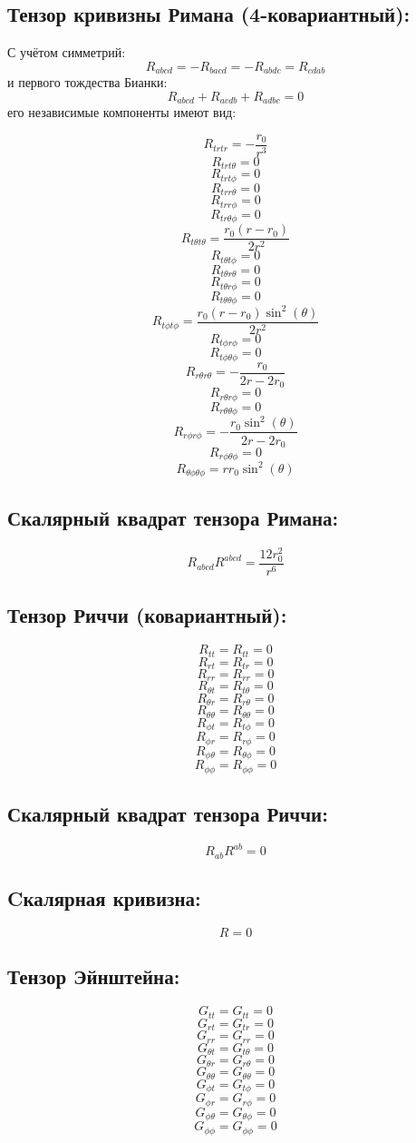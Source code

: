 \documentclass[a4paper, 10pt]{article}
\begin{document}
\subsection{Тензор кривизны Римана (4-ковариантный):}

С учётом симметрий:
$$R_{abcd}=-R_{bacd}=-R_{abdc}=R_{cdab}$$
и первого тождества Бианки:
$$R_{abcd}+R_{acdb}+R_{adbc}=0$$
его независимые компоненты имеют вид:

$$R_{t r t r} = - \frac{r_{0}}{r^{3}}$$
$$R_{t r t \theta} = 0$$
$$R_{t r t \phi} = 0$$
$$R_{t r r \theta} = 0$$
$$R_{t r r \phi} = 0$$
$$R_{t r \theta \phi} = 0$$
$$R_{t \theta t \theta} = \frac{r_{0} \left(r - r_{0}\right)}{2 r^{2}}$$
$$R_{t \theta t \phi} = 0$$
$$R_{t \theta r \theta} = 0$$
$$R_{t \theta r \phi} = 0$$
$$R_{t \theta \theta \phi} = 0$$
$$R_{t \phi t \phi} = \frac{r_{0} \left(r - r_{0}\right) \sin^{2}{\left(\theta \right)}}{2 r^{2}}$$
$$R_{t \phi r \phi} = 0$$
$$R_{t \phi \theta \phi} = 0$$
$$R_{r \theta r \theta} = - \frac{r_{0}}{2 r - 2 r_{0}}$$
$$R_{r \theta r \phi} = 0$$
$$R_{r \theta \theta \phi} = 0$$
$$R_{r \phi r \phi} = - \frac{r_{0} \sin^{2}{\left(\theta \right)}}{2 r - 2 r_{0}}$$
$$R_{r \phi \theta \phi} = 0$$
$$R_{\theta \phi \theta \phi} = r r_{0} \sin^{2}{\left(\theta \right)}$$
\subsection{Скалярный квадрат тензора Римана:}
$$ R_{abcd}R^{abcd} = \frac{12 r_{0}^{2}}{r^{6}}$$
\subsection{Тензор Риччи (ковариантный):}
$$R_{t t} = R_{t t} = 0$$
$$R_{r t} = R_{t r} = 0$$
$$R_{r r} = R_{r r} = 0$$
$$R_{\theta t} = R_{t \theta} = 0$$
$$R_{\theta r} = R_{r \theta} = 0$$
$$R_{\theta \theta} = R_{\theta \theta} = 0$$
$$R_{\phi t} = R_{t \phi} = 0$$
$$R_{\phi r} = R_{r \phi} = 0$$
$$R_{\phi \theta} = R_{\theta \phi} = 0$$
$$R_{\phi \phi} = R_{\phi \phi} = 0$$
\subsection{Скалярный квадрат тензора Риччи:}
$$ R_{ab}R^{ab} = 0$$
\subsection{Cкалярная кривизна:}
$$ R = 0$$
\subsection{Тензор Эйнштейна:}
$$G_{t t} = G_{t t} = 0$$
$$G_{r t} = G_{t r} = 0$$
$$G_{r r} = G_{r r} = 0$$
$$G_{\theta t} = G_{t \theta} = 0$$
$$G_{\theta r} = G_{r \theta} = 0$$
$$G_{\theta \theta} = G_{\theta \theta} = 0$$
$$G_{\phi t} = G_{t \phi} = 0$$
$$G_{\phi r} = G_{r \phi} = 0$$
$$G_{\phi \theta} = G_{\theta \phi} = 0$$
$$G_{\phi \phi} = G_{\phi \phi} = 0$$
\end{document}

